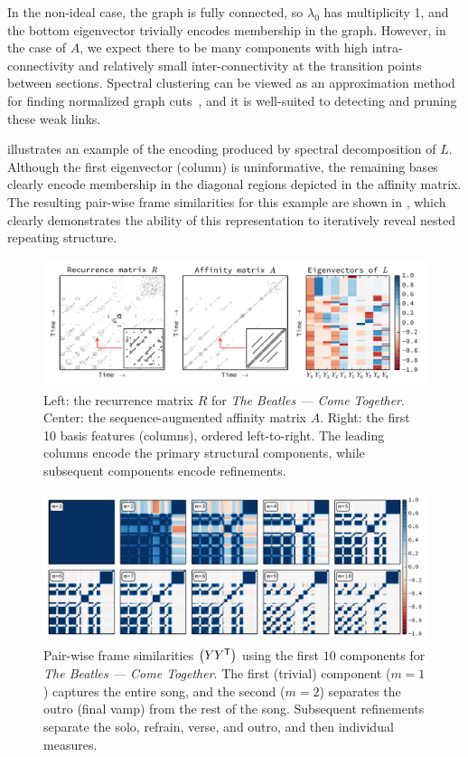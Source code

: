 \documentclass{article}
\begin{document}
In the non-ideal case, the graph is fully connected, so $\lambda_0$ has multiplicity 1, 
and the bottom eigenvector trivially encodes membership in the graph. 
However, in the case of $A$, we expect there to be many components
with high intra-connectivity and relatively small inter-connectivity at the
transition points between sections.  Spectral clustering can be viewed as an approximation 
method for finding normalized graph cuts~\cite{von2007tutorial}, and it is well-suited to detecting and pruning these weak links.

 illustrates an example of the encoding produced by spectral
decomposition of $L$.  Although the first eigenvector (column) is uninformative, 
the remaining bases clearly encode membership in the diagonal regions depicted in the 
affinity matrix.  
The resulting pair-wise frame similarities for this example are shown in , 
which clearly demonstrates the ability of this representation to iteratively reveal 
nested repeating structure.

\begin{figure}[t]
\centering
\includegraphics[width=\textwidth]{figs/recurrence}
\caption{Left: the recurrence matrix $R$ for \emph{The Beatles --- Come
Together}. Center: the sequence-augmented affinity matrix $A$.
Right: the first 10 basis features (columns), ordered left-to-right.  
The leading columns encode the primary structural components, while subsequent
components encode refinements.\label{recurrence}}
\end{figure}

 
\begin{figure}[t]
\centering
\includegraphics[width=\textwidth]{figs/lowrank}
\caption{Pair-wise frame similarities $\left(YY^\mathsf{T}\right)$ using the first $10$ components for \emph{The Beatles --- Come Together}.  The first
(trivial) component ($m=1$) captures the entire song, and the second ($m=2$) separates
the outro (final vamp) from the rest of the song.  
Subsequent refinements separate the solo, refrain, verse, and outro, and then individual measures.\label{lowrank}}
\end{figure}
\end{document}
